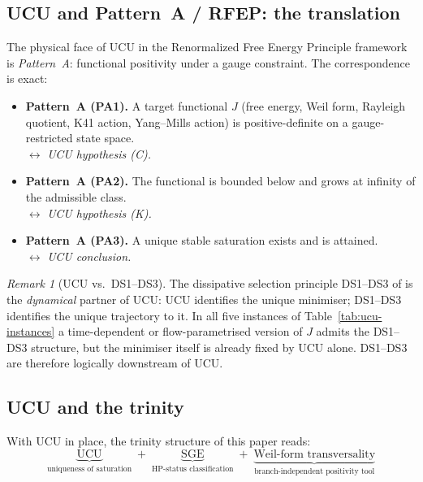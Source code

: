 \documentclass[11pt]{article}
\theoremstyle{definition}
\theoremstyle{remark}
\newtheorem{remark}[theorem]{Remark}
\begin{document}
\subsection{UCU and Pattern~A / RFEP: the translation}
\label{sec:ucu-pattern-a}

The physical face of UCU in the Renormalized Free Energy Principle
framework \cite{RFEPFramework} is \emph{Pattern~A}: functional
positivity under a gauge constraint. The correspondence is exact:

\begin{itemize}
\item \textbf{Pattern~A (PA1).} A target functional $J$ (free
energy, Weil form, Rayleigh quotient, K41 action, Yang--Mills
action) is positive-definite on a gauge-restricted state space.\\
$\longleftrightarrow$ \emph{UCU hypothesis (C).}

\item \textbf{Pattern~A (PA2).} The functional is bounded below
and grows at infinity of the admissible class.\\
$\longleftrightarrow$ \emph{UCU hypothesis (K).}

\item \textbf{Pattern~A (PA3).} A unique stable saturation exists
and is attained.\\
$\longleftrightarrow$ \emph{UCU conclusion.}
\end{itemize}

\begin{remark}[UCU vs.\ DS1--DS3]\label{rem:ucu-vs-ds}
The dissipative selection principle DS1--DS3 of
\cite{RFEPFramework} is the \emph{dynamical} partner of UCU: UCU
identifies the unique minimiser; DS1--DS3 identifies the unique
trajectory to it. In all five instances of
Table~\ref{tab:ucu-instances} a time-dependent or flow-parametrised
version of $J$ admits the DS1--DS3 structure, but the minimiser
itself is already fixed by UCU alone. DS1--DS3 are therefore
logically downstream of UCU.
\end{remark}

\subsection{UCU and the trinity}
\label{sec:ucu-trinity}

With UCU in place, the trinity structure of this paper reads:
\[
  \underbrace{\text{UCU}}_{\text{uniqueness of saturation}}
  \;+\;
  \underbrace{\text{SGE}}_{\text{HP-status classification}}
  \;+\;
  \underbrace{\text{Weil-form transversality}}_{\text{branch-independent positivity tool}}
\]
\end{document}
